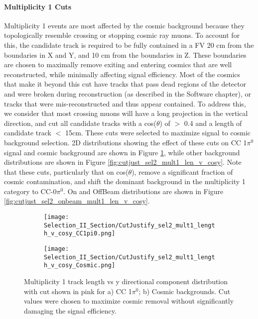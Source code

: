 \paragraph{Multiplicity 1 Cuts}
Multiplicity 1 events are most affected by the cosmic background because they topologically resemble crossing or stopping cosmic ray muons. To account for this, the candidate track is required to be fully contained in a FV 20 cm from the boundaries in X and Y, and 10 cm from the boundaries in Z. These boundaries are chosen to maximally remove exiting and entering cosmics that are well reconstructed, while minimally affecting signal efficiency.  Most of the cosmics that make it beyond this cut have tracks that pass dead regions of the detector and were broken during reconstruction (as described in the Software chapter), or tracks that were mis-reconstructed and thus appear contained. To address this, we consider that most crossing muons will have a long projection in the vertical direction, and cut all candidate tracks with a cos($\theta$) of $>$ 0.4 and a length of candidate track $<$ 15cm. These cuts were selected to maximize signal to cosmic background selection.  2D distributions showing the effect of these cuts on CC 1$\pi^0$ signal and cosmic background are shown in Figure  \ref{fig:cutjust_sel2_mult1_len_v_cosy_sig}, while other background distributions are shown in Figure \ref{fig:cutjust_sel2_mult1_len_v_cosy}.  Note that these cuts, particularly that on cos($\theta$), remove a significant fraction of cosmic contamination, and shift the dominant background in the multiplicity 1 category to CC-0$\pi^0$.  On and OffBeam distributions are shown in Figure \ref{fig:cutjust_sel2_onbeam_mult1_len_v_cosy}. 

\begin{figure}[H]
\centering
  \begin{subfigure}[t]{0.36\textwidth}
    \centering
    \texttt{[image: Selection\_II\_Section/CutJustify\_sel2\_mult1\_length\_v\_cosy\_CC1pi0.png]}
   	\caption{ }
  \end{subfigure} 
  \hspace{10mm}
  \begin{subfigure}[t]{0.36\textwidth}
    \centering
    \texttt{[image: Selection\_II\_Section/CutJustify\_sel2\_mult1\_length\_v\_cosy\_Cosmic.png]}
	\caption{ }
  \end{subfigure} 
  \caption{Multiplicity 1 track length vs y directional component distribution with cut shown in pink for a) CC 1$\pi^0$; b) Cosmic backgrounds. Cut values were chosen to maximize cosmic removal without significantly damaging the signal efficiency. }
  \label{fig:cutjust_sel2_mult1_len_v_cosy_sig}
  \end{figure}
  
